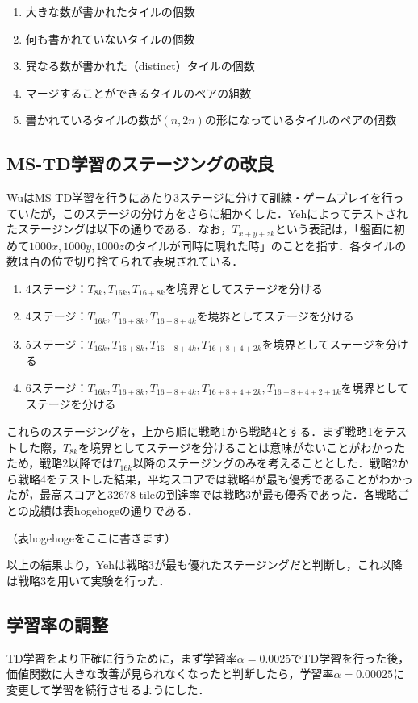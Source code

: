 \documentclass{suribt}
\begin{document}
\begin{enumerate}
\item 大きな数が書かれたタイルの個数
\item 何も書かれていないタイルの個数
\item 異なる数が書かれた（distinct）タイルの個数
\item マージすることができるタイルのペアの組数
\item 書かれているタイルの数が$(n, 2n)$の形になっているタイルのペアの個数
\end{enumerate}

\subsection{MS-TD学習のステージングの改良}
WuはMS-TD学習を行うにあたり3ステージに分けて訓練・ゲームプレイを行っていたが，このステージの分け方をさらに細かくした．Yehによってテストされたステージングは以下の通りである．なお，$T_{x+y+zk}$という表記は，「盤面に初めて$1000x, 1000y, 1000z$のタイルが同時に現れた時」のことを指す．各タイルの数は百の位で切り捨てられて表現されている．

\begin{enumerate}
\item 4ステージ：$T_{8k}, T_{16k}, T_{16+8k}$を境界としてステージを分ける
\item 4ステージ：$T_{16k}, T_{16+8k}, T_{16+8+4k}$を境界としてステージを分ける
\item 5ステージ：$T_{16k}, T_{16+8k}, T_{16+8+4k}, T_{16+8+4+2k}$を境界としてステージを分ける
\item 6ステージ：$T_{16k}, T_{16+8k}, T_{16+8+4k}, T_{16+8+4+2k}, T_{16+8+4+2+1k}$を境界としてステージを分ける
\end{enumerate}

これらのステージングを，上から順に戦略1から戦略4とする．まず戦略1をテストした際，$T_{8k}$を境界としてステージを分けることは意味がないことがわかったため，戦略2以降では$T_{16k}$以降のステージングのみを考えることとした．戦略2から戦略4をテストした結果，平均スコアでは戦略4が最も優秀であることがわかったが，最高スコアと32678-tileの到達率では戦略3が最も優秀であった．各戦略ごとの成績は表hogehogeの通りである．

（表hogehogeをここに書きます）

以上の結果より，Yehは戦略3が最も優れたステージングだと判断し，これ以降は戦略3を用いて実験を行った．

\subsection{学習率の調整}
TD学習をより正確に行うために，まず学習率$\alpha = 0.0025$でTD学習を行った後，価値関数に大きな改善が見られなくなったと判断したら，学習率$\alpha = 0.00025$に変更して学習を続行させるようにした．
\end{document}
